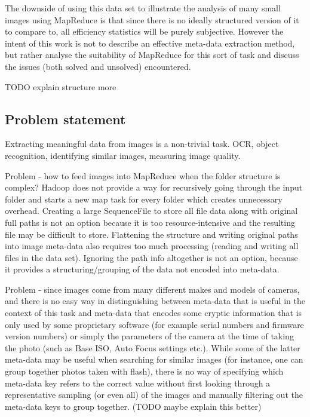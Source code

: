 \documentclass [12pt,a4paper]{report}
\begin{document}
The downside of using this data set to illustrate the analysis of many small images using MapReduce is that since there is no ideally structured version of it to compare to, all efficiency statistics will be purely subjective. However the intent of this work is not to describe an effective meta-data extraction method, but rather analyse the suitability of MapReduce for this sort of task and discuss the issues (both solved and unsolved) encountered.

TODO explain structure more

\subsection{Problem statement}

Extracting meaningful data from images is a non-trivial task. OCR, object recognition, identifying similar images, measuring image quality.

Problem - how to feed images into MapReduce when the folder structure is complex? Hadoop does not provide a way for recursively going through the input folder and starts a new map task for every folder which creates unnecessary overhead. Creating a large SequenceFile to store all file data along with original full paths is not an option because it is too resource-intensive and the resulting file may be difficult to store. Flattening the structure and writing original paths into image meta-data also requires too much processing (reading and writing all files in the data set). Ignoring the path info altogether is not an option, because it provides a structuring/grouping of the data not encoded into meta-data.

Problem - since images come from many different makes and models of cameras, and there is no easy way in distinguishing between meta-data that is useful in the context of this task and meta-data that encodes some cryptic information that is only used by some proprietary software (for example serial numbers and firmware version numbers) or simply the parameters of the camera at the time of taking the photo (such as Base ISO, Auto Focus settings etc.). While some of the latter meta-data may be useful when searching for similar images (for instance, one can group together photos taken with flash), there is no way of specifying which meta-data key refers to the correct value without first looking through a representative sampling (or even all) of the images and manually filtering out the meta-data keys to group together. (TODO maybe explain this better)
\end{document}
